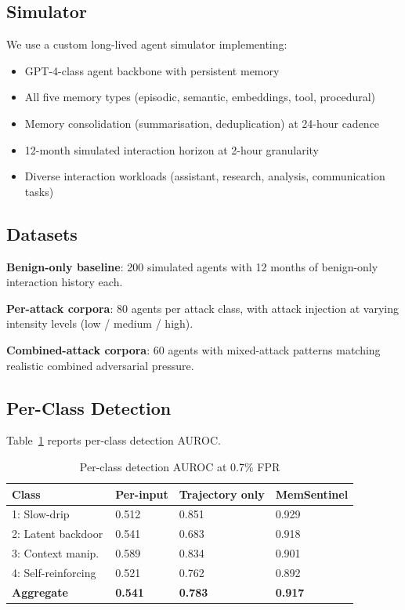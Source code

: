 \documentclass[sigconf,nonacm]{acmart}
\begin{document}
\subsection{Simulator}

We use a custom long-lived agent simulator implementing:

\begin{itemize}
  \item GPT-4-class agent backbone with persistent memory
  \item All five memory types (episodic, semantic, embeddings, tool,
        procedural)
  \item Memory consolidation (summarisation, deduplication) at
        24-hour cadence
  \item 12-month simulated interaction horizon at 2-hour
        granularity
  \item Diverse interaction workloads (assistant, research,
        analysis, communication tasks)
\end{itemize}

\subsection{Datasets}

\textbf{Benign-only baseline}: 200 simulated agents with 12 months
of benign-only interaction history each.

\textbf{Per-attack corpora}: 80 agents per attack class, with
attack injection at varying intensity levels (low / medium /
high).

\textbf{Combined-attack corpora}: 60 agents with mixed-attack
patterns matching realistic combined adversarial pressure.

\subsection{Per-Class Detection}

Table~\ref{tab:perclass} reports per-class detection AUROC.

\begin{table}[h]
\caption{Per-class detection AUROC at 0.7\% FPR}
\label{tab:perclass}
\small
\begin{tabularx}{\columnwidth}{@{}p{2.4cm}X X X@{}}
\toprule
\textbf{Class} & \textbf{Per-input} & \textbf{Trajectory only} & \textbf{MemSentinel} \\
\midrule
1: Slow-drip       & 0.512 & 0.851 & 0.929 \\
2: Latent backdoor & 0.541 & 0.683 & 0.918 \\
3: Context manip.\  & 0.589 & 0.834 & 0.901 \\
4: Self-reinforcing & 0.521 & 0.762 & 0.892 \\
\midrule
\textbf{Aggregate} & \textbf{0.541} & \textbf{0.783} & \textbf{0.917} \\
\bottomrule
\end{tabularx}
\end{table}
\end{document}
